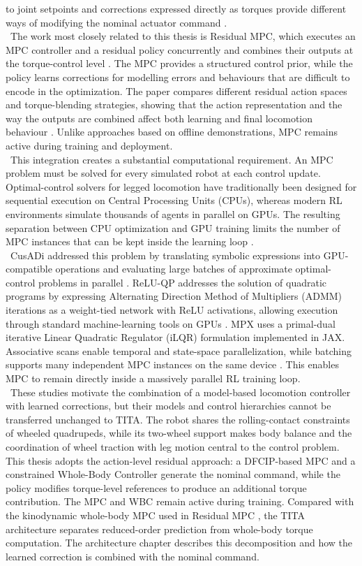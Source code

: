 to joint setpoints and corrections expressed directly as torques provide
different ways of modifying the nominal actuator command
\cite{residual_mpc}.\\
\
The work most closely related to this thesis is Residual MPC, which executes an
MPC controller and a residual policy concurrently and combines their outputs at
the torque-control level \cite{residual_mpc}. The MPC provides a structured
control prior, while the policy learns corrections for modelling errors and
behaviours that are difficult to encode in the optimization. The paper compares
different residual action spaces and torque-blending strategies, showing that
the action representation and the way the outputs are combined affect both
learning and final locomotion behaviour \cite{residual_mpc}. Unlike approaches based on
offline demonstrations, MPC
remains active during training and deployment.\\
\
This integration creates a substantial computational requirement. An MPC
problem must be solved for every simulated robot at each control update.
Optimal-control solvers for legged locomotion have traditionally been designed
for sequential execution on Central Processing Units
(CPUs), whereas modern RL environments simulate
thousands of agents in parallel on GPUs. The resulting separation between CPU
optimization and GPU training limits the number of MPC instances that can be
kept inside the learning loop \cite{residual_mpc,mpx}.\\
\
CusADi addressed this problem by translating symbolic expressions into
GPU-compatible operations and evaluating large batches of approximate
optimal-control problems in parallel \cite{cusadi}. ReLU-QP addresses the
solution of quadratic programs by expressing Alternating Direction Method of
Multipliers (ADMM) iterations as a weight-tied
network with ReLU activations, allowing execution through standard
machine-learning tools on GPUs \cite{relu_qp}. MPX uses a primal-dual
iterative Linear Quadratic Regulator (iLQR) formulation
implemented in JAX. Associative scans enable temporal and state-space
parallelization, while batching supports many independent MPC instances on
the same device \cite{mpx}. This enables MPC to remain directly inside a
massively parallel RL training loop.\\
\
These studies motivate the combination of a model-based locomotion controller
with learned corrections, but their models and control hierarchies cannot be
transferred unchanged to TITA. The robot shares the rolling-contact constraints
of wheeled quadrupeds, while its two-wheel support makes body balance and the
coordination of wheel traction with leg motion central to the control problem.
This thesis adopts the action-level residual approach: a DFCIP-based MPC and a
constrained Whole-Body Controller generate the nominal command, while the
policy modifies torque-level references to produce an additional torque
contribution. The MPC and WBC remain active during training. Compared with the
kinodynamic whole-body MPC used in Residual MPC \cite{residual_mpc}, the TITA
architecture separates reduced-order prediction from whole-body torque
computation. The architecture chapter describes this decomposition and how
the learned correction is combined with the nominal command.
